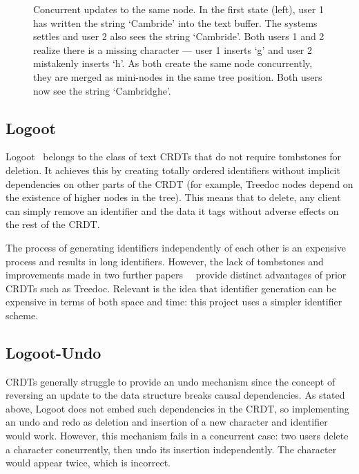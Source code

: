\documentclass[12pt,a4paper,twoside,openright]{report}
\begin{document}
\begin{figure}[htb]
\begin{tabular}{ >{\centering}m{6cm} >{\centering}m{15mm} >{\centering\arraybackslash}m{6cm} }
  \end{tabular}
\caption[Concurrent Updates in Treedoc]{Concurrent updates to the same node. In the first state (left), user 1 has written the string `Cambride' into the text buffer. The systems settles and user 2 also sees the string `Cambride'. Both users 1 and 2 realize there is a missing character --- user 1 inserts `g' and user 2 mistakenly inserts `h'. As both create the same node concurrently, they are merged as mini-nodes in the same tree position. Both users now see the string `Cambridghe'.}
\label{fig:treedoc}
\end{figure}

\subsection{Logoot} \label{sec:logoot}

Logoot~\cite{weiss2008} belongs to the class of text CRDTs that do not require tombstones for deletion. It achieves this by creating totally ordered identifiers without implicit dependencies on other parts of the CRDT (for example, Treedoc nodes depend on the existence of higher nodes in the tree). This means that to delete, any client can simply remove an identifier and the data it tags without adverse effects on the rest of the CRDT.

The process of generating identifiers independently of each other is an expensive process and results in long identifiers. However, the lack of tombstones and improvements made in two further papers~\cite{nedelec2013lseq}~\cite{nedelec2013} provide distinct advantages of prior CRDTs such as Treedoc. Relevant is the idea that identifier generation can be expensive in terms of both space and time: this project uses a simpler identifier scheme.



\subsection{Logoot-Undo} \label{sec:logootundo}

CRDTs generally struggle to provide an undo mechanism since the concept of reversing an update to the data structure breaks causal dependencies. As stated above, Logoot does not embed such dependencies in the CRDT, so implementing an undo and redo as deletion and insertion of a new character and identifier would work. However, this mechanism fails in a concurrent case: two users delete a character concurrently, then undo its insertion independently. The character would appear twice, which is incorrect.
\end{document}
